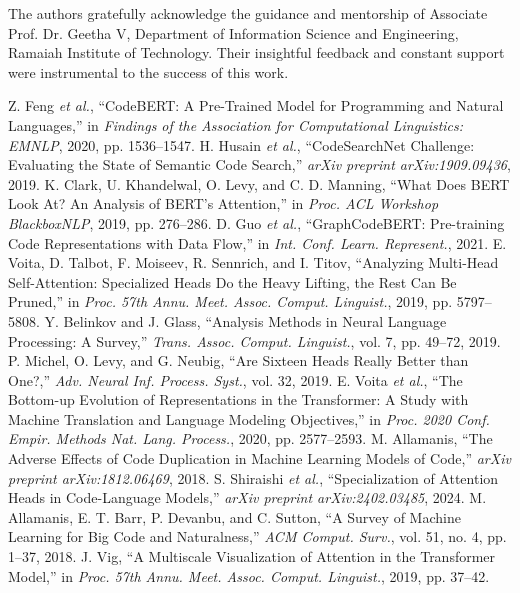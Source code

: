 \documentclass[conference]{IEEEtran}
\begin{document}
{The authors gratefully acknowledge the guidance and mentorship of Associate Prof. Dr. Geetha V, Department of Information Science and Engineering, Ramaiah Institute of Technology. Their insightful feedback and constant support were instrumental to the success of this work.

\begin{thebibliography}{00}
 Z. Feng \textit{et al.}, ``CodeBERT: A Pre-Trained Model for Programming and Natural Languages,'' in \textit{Findings of the Association for Computational Linguistics: EMNLP}, 2020, pp. 1536--1547.
 H. Husain \textit{et al.}, ``CodeSearchNet Challenge: Evaluating the State of Semantic Code Search,'' \textit{arXiv preprint arXiv:1909.09436}, 2019.
 K. Clark, U. Khandelwal, O. Levy, and C. D. Manning, ``What Does BERT Look At? An Analysis of BERT's Attention,'' in \textit{Proc. ACL Workshop BlackboxNLP}, 2019, pp. 276--286.
 D. Guo \textit{et al.}, ``GraphCodeBERT: Pre-training Code Representations with Data Flow,'' in \textit{Int. Conf. Learn. Represent.}, 2021.
 E. Voita, D. Talbot, F. Moiseev, R. Sennrich, and I. Titov, ``Analyzing Multi-Head Self-Attention: Specialized Heads Do the Heavy Lifting, the Rest Can Be Pruned,'' in \textit{Proc. 57th Annu. Meet. Assoc. Comput. Linguist.}, 2019, pp. 5797--5808.
 Y. Belinkov and J. Glass, ``Analysis Methods in Neural Language Processing: A Survey,'' \textit{Trans. Assoc. Comput. Linguist.}, vol. 7, pp. 49--72, 2019.
 P. Michel, O. Levy, and G. Neubig, ``Are Sixteen Heads Really Better than One?,'' \textit{Adv. Neural Inf. Process. Syst.}, vol. 32, 2019.
 E. Voita \textit{et al.}, ``The Bottom-up Evolution of Representations in the Transformer: A Study with Machine Translation and Language Modeling Objectives,'' in \textit{Proc. 2020 Conf. Empir. Methods Nat. Lang. Process.}, 2020, pp. 2577--2593.
 M. Allamanis, ``The Adverse Effects of Code Duplication in Machine Learning Models of Code,'' \textit{arXiv preprint arXiv:1812.06469}, 2018.
 S. Shiraishi \textit{et al.}, ``Specialization of Attention Heads in Code-Language Models,'' \textit{arXiv preprint arXiv:2402.03485}, 2024.
 M. Allamanis, E. T. Barr, P. Devanbu, and C. Sutton, ``A Survey of Machine Learning for Big Code and Naturalness,'' \textit{ACM Comput. Surv.}, vol. 51, no. 4, pp. 1--37, 2018.
 J. Vig, ``A Multiscale Visualization of Attention in the Transformer Model,'' in \textit{Proc. 57th Annu. Meet. Assoc. Comput. Linguist.}, 2019, pp. 37--42.

\end{thebibliography}}
\end{document}
